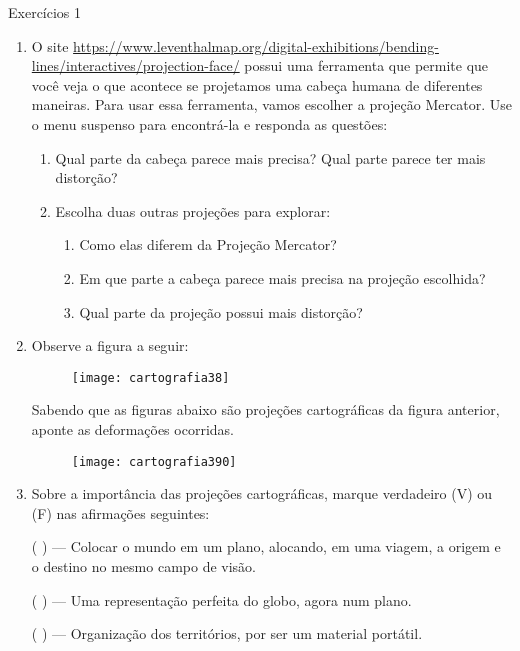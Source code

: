 {\begin{answer}{Exercícios}
{}{1}
\end{answer}

\begin{enumerate}

\item O site \url{https://www.leventhalmap.org/digital-exhibitions/bending-lines/interactives/projection-face/} possui uma ferramenta que permite que você veja o que acontece se projetamos uma cabeça humana de diferentes maneiras.  Para usar essa ferramenta, vamos escolher a projeção Mercator. Use o menu suspenso para encontrá-la e responda as questões:
\begin{enumerate}
\item Qual parte da cabeça parece mais precisa? Qual parte parece ter mais distorção?
\item Escolha duas outras projeções para explorar:
\begin{enumerate}
\item Como elas diferem da Projeção Mercator?
\item Em que parte  a cabeça parece mais precisa na projeção escolhida?
\item  Qual parte da projeção possui mais distorção?
\end{enumerate}
\end{enumerate}

\clearpage


\item Observe a figura a seguir: 

\begin{figure}[H]
\centering
\texttt{[image: cartografia38]}
\end{figure}

Sabendo que as figuras abaixo são projeções cartográficas da figura anterior, aponte as deformações ocorridas.

\begin{figure}[H]
\centering
\texttt{[image: cartografia390]}
\end{figure}


\item Sobre a importância das projeções cartográficas, marque verdadeiro (V) ou (F) nas afirmações seguintes:

({ }{ }{ }) --- Colocar o mundo em um plano, alocando, em uma viagem, a origem e o destino no mesmo campo de visão.

({ }{ }{ }) --- Uma representação perfeita do globo, agora num plano.

({ }{ }{ }) --- Organização dos territórios, por ser um material portátil.


\end{enumerate}}
